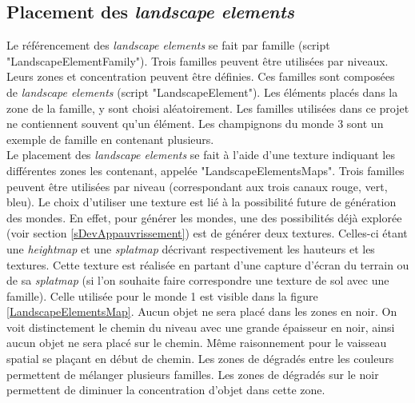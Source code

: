 	
	\subsection*{Placement des \textit{landscape elements}}
		Le référencement des \textit{landscape elements} se fait par famille (script "LandscapeElementFamily"). Trois familles peuvent être utilisées par niveaux. Leurs zones et concentration peuvent être définies. Ces familles sont composées de \textit{landscape elements} (script "LandscapeElement"). Les éléments placés dans la zone de la famille, y sont choisi aléatoirement. Les familles utilisées dans ce projet ne contiennent souvent qu'un élément. Les champignons du monde 3 sont un exemple de famille en contenant plusieurs.
		\\
	
		Le placement des \textit{landscape elements} se fait à l'aide d'une texture indiquant les différentes zones les contenant, appelée "LandscapeElementsMaps". Trois familles peuvent être utilisées par niveau (correspondant aux trois canaux rouge, vert, bleu). Le choix d'utiliser une texture est lié à la possibilité future de génération des mondes. En effet, pour générer les mondes, une des possibilités déjà explorée (voir section \ref{sDevAppauvrissement}) est de générer deux textures. Celles-ci étant une \textit{heightmap} et une \textit{splatmap} décrivant respectivement les hauteurs et les textures.
		Cette texture est réalisée en partant d'une capture d'écran du terrain ou de sa \textit{splatmap} (si l'on souhaite faire correspondre une texture de sol avec une famille). Celle utilisée pour le monde 1 est visible dans la figure \ref{LandscapeElementsMap}. Aucun objet ne sera placé dans les zones en noir. On voit distinctement le chemin du niveau avec une grande épaisseur en noir, ainsi aucun objet ne sera placé sur le chemin. Même raisonnement pour le vaisseau spatial se plaçant en début de chemin. Les zones de dégradés entre les couleurs permettent de mélanger plusieurs familles. Les zones de dégradés sur le noir permettent de diminuer la concentration d'objet dans cette zone.\medskip
		
